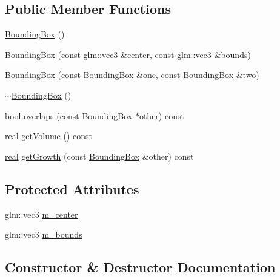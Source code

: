 \subsection*{Public Member Functions}
\begin{DoxyCompactItemize}
\item 
\mbox{\hyperlink{classr3_1_1_bounding_box_a088852419e2b7af17f2e94d672a70bcf}{Bounding\+Box}} ()
\item 
\mbox{\hyperlink{classr3_1_1_bounding_box_abb61e82e1d736772f92b4f5b519c755d}{Bounding\+Box}} (const glm\+::vec3 \&center, const glm\+::vec3 \&bounds)
\item 
\mbox{\hyperlink{classr3_1_1_bounding_box_a23750f8e74b918e0b39ce2c2fe609574}{Bounding\+Box}} (const \mbox{\hyperlink{classr3_1_1_bounding_box}{Bounding\+Box}} \&one, const \mbox{\hyperlink{classr3_1_1_bounding_box}{Bounding\+Box}} \&two)
\item 
\mbox{\hyperlink{classr3_1_1_bounding_box_a9257cfab936d3331cba765cb19527aa1}{$\sim$\+Bounding\+Box}} ()
\item 
bool \mbox{\hyperlink{classr3_1_1_bounding_box_a6e69163febe125531fa355ae9876b8be}{overlaps}} (const \mbox{\hyperlink{classr3_1_1_bounding_box}{Bounding\+Box}} $\ast$other) const
\item 
\mbox{\hyperlink{namespacer3_ab2016b3e3f743fb735afce242f0dc1eb}{real}} \mbox{\hyperlink{classr3_1_1_bounding_box_a3e6a9b79373dde150d18d5d5df59a2f3}{get\+Volume}} () const
\item 
\mbox{\hyperlink{namespacer3_ab2016b3e3f743fb735afce242f0dc1eb}{real}} \mbox{\hyperlink{classr3_1_1_bounding_box_a21631e2fffeb995d3a9647489f936d13}{get\+Growth}} (const \mbox{\hyperlink{classr3_1_1_bounding_box}{Bounding\+Box}} \&other) const
\end{DoxyCompactItemize}
\subsection*{Protected Attributes}
\begin{DoxyCompactItemize}
\item 
glm\+::vec3 \mbox{\hyperlink{classr3_1_1_bounding_box_ae7f47ade2f27fb7e76da58c944141d80}{m\+\_\+center}}
\item 
glm\+::vec3 \mbox{\hyperlink{classr3_1_1_bounding_box_ad23e4002c102c50ac31f6bb5da6d9d39}{m\+\_\+bounds}}
\end{DoxyCompactItemize}


\subsection{Constructor \& Destructor Documentation}
\mbox{\label{classr3_1_1_bounding_box_a088852419e2b7af17f2e94d672a70bcf}} 
